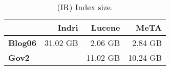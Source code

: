 \begin{table}[t]
\centering
{\small
\begin{tabular}{|l|r|r|r|}
    \hline & \textbf{Indri} & \textbf{Lucene} & \textbf{MeTA} \\
    \hline
    \textbf{Blog06} & 31.02 GB & 2.06 GB & 2.84 GB \\
    \textbf{Gov2} & & 11.02 GB & 10.24 GB \\
    \hline
\end{tabular}
\caption{(IR) Index size.}
\label{table:ir-index-size}
}
\end{table}
